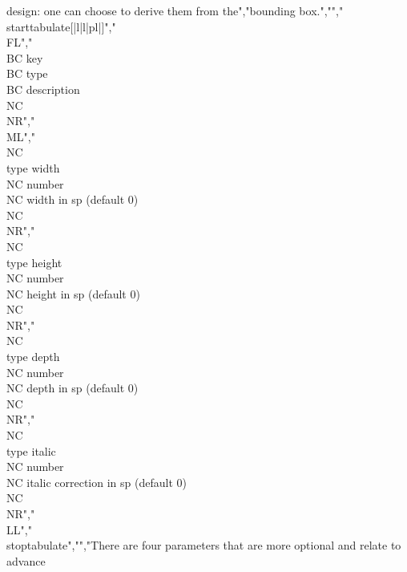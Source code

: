 design: one can choose to derive them from the","bounding box.","","\\starttabulate[|l|l|pl|]","\\FL","\\BC key            \\BC type   \\BC description                         \\NC \\NR","\\ML","\\NC \\type {width}  \\NC number \\NC width in sp (default 0)             \\NC \\NR","\\NC \\type {height} \\NC number \\NC height in sp (default 0)            \\NC \\NR","\\NC \\type {depth}  \\NC number \\NC depth in sp (default 0)             \\NC \\NR","\\NC \\type {italic} \\NC number \\NC italic correction in sp (default 0) \\NC \\NR","\\LL","\\stoptabulate","","There are four parameters that are more optional and relate to advance
